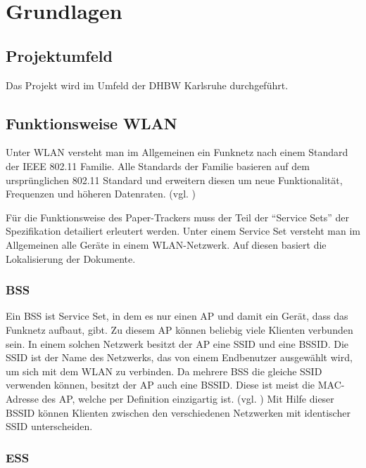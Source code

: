 \chapter{Grundlagen}

\section{Projektumfeld}

Das Projekt wird im Umfeld der \gls{DHBW} Karlsruhe durchgeführt.
\TODO{}

\section{Funktionsweise \gls{WLAN}}

Unter \gls{WLAN} versteht man im Allgemeinen ein Funknetz nach einem Standard der \gls{IEEE} 802.11 Familie.
Alle Standards der Familie basieren auf dem ursprünglichen 802.11 Standard und erweitern diesen um neue Funktionalität, Frequenzen und höheren Datenraten.
(vgl. \cite{Schnabel2020})

Für die Funktionsweise des Paper-Trackers muss der Teil der \enquote{Service Sets} der Spezifikation detailiert erleutert werden.
Unter einem Service Set versteht man im Allgemeinen alle Geräte in einem \gls{WLAN}-Netzwerk.
Auf diesen basiert die Lokalisierung der Dokumente.

\subsection{\gls{BSS}}

Ein \gls{BSS} ist Service Set, in dem es nur einen \gls{AP} und damit ein Gerät, dass das Funknetz aufbaut, gibt.
Zu diesem \gls{AP} können beliebig viele Klienten verbunden sein.
In einem solchen Netzwerk besitzt der \gls{AP} eine \gls{SSID} und eine \gls{BSSID}.
Die \gls{SSID} ist der Name des Netzwerks, das von einem Endbenutzer ausgewählt wird, um sich mit dem \gls{WLAN} zu verbinden.
Da mehrere \gls{BSS} die gleiche \gls{SSID} verwenden können, besitzt der \gls{AP} auch eine \gls{BSSID}.
Diese ist meist die \gls{MAC}-Adresse des \gls{AP}, welche per Definition einzigartig ist.
(vgl. \cite{Luber2018})
Mit Hilfe dieser \gls{BSSID} können Klienten zwischen den verschiedenen Netzwerken mit identischer \gls{SSID} unterscheiden.

\subsection{\gls{ESS}}

